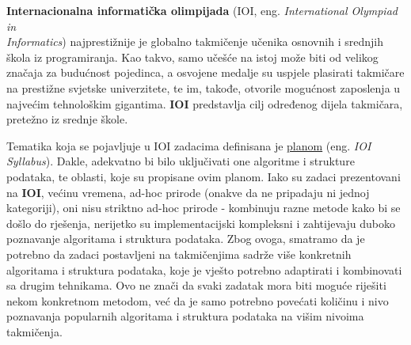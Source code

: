 \hspace{2em}\textbf{Internacionalna informatička olimpijada} (IOI, eng. \textit{International Olympiad in \\ Informatics}) najprestižnije je globalno takmičenje učenika osnovnih i srednjih škola iz programiranja. Kao takvo, samo učešće na istoj može biti od velikog značaja za budućnost pojedinca, a osvojene medalje su uspjele plasirati takmičare na prestižne svjetske univerzitete, te im, takođe, otvorile mogućnost zaposlenja u najvećim tehnološkim gigantima. \textbf{IOI} predstavlja cilj određenog dijela takmičara, pretežno iz srednje škole.

Tematika koja se pojavljuje u IOI zadacima definisana je \href{https://ioinformatics.org/page/syllabus/12}{planom}  (eng. \textit{IOI Syllabus}). Dakle, adekvatno bi bilo uključivati one algoritme i strukture podataka, te oblasti, koje su propisane ovim planom.
Iako su zadaci prezentovani na \textbf{IOI}, većinu vremena, ad-hoc prirode (onakve da ne pripadaju ni jednoj kategoriji), oni nisu striktno ad-hoc prirode - kombinuju razne metode kako bi se došlo do rješenja, nerijetko su implementacijski kompleksni i zahtijevaju duboko poznavanje algoritama i struktura podataka.
Zbog ovoga, smatramo da je potrebno da zadaci postavljeni na takmičenjima sadrže više konkretnih algoritama i struktura podataka, koje je vješto potrebno adaptirati i kombinovati sa drugim tehnikama. Ovo ne znači da svaki zadatak mora biti moguće riješiti nekom konkretnom metodom, već da je samo potrebno povećati količinu i nivo poznavanja popularnih algoritama i struktura podataka na višim nivoima takmičenja.